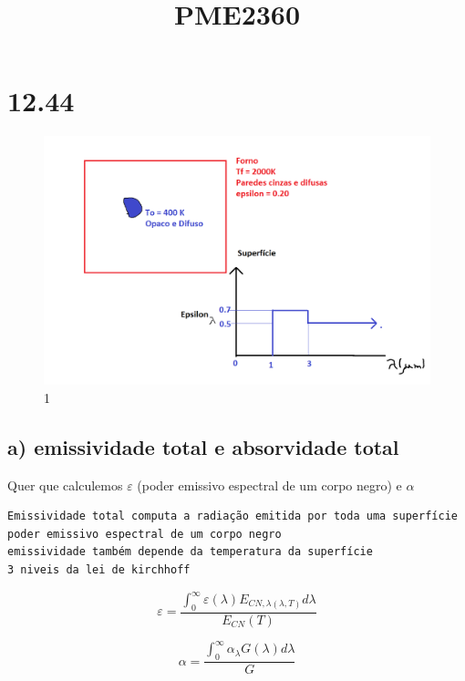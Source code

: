 \documentclass[a4paper, 12pt]{article}
\title{PME2360}
\begin{document}
\maketitle

\section{12.44}

\begin{figure}[h]
\begin{center}
\includegraphics[scale=0.28]{./fig/1.png}
\caption{\label{fig:1}1} 
\end{center}
\end{figure}

\subsection{a) emissividade total e absorvidade total}

Quer que calculemos $\varepsilon$ (poder emissivo espectral de um corpo negro) e $\alpha$


\begin{verbatim}
Emissividade total computa a radiação emitida por toda uma superfície
poder emissivo espectral de um corpo negro
emissividade também depende da temperatura da superfície
3 niveis da lei de kirchhoff
\end{verbatim}

\[\varepsilon = \frac{\int _{0} ^{\infty} {\varepsilon(\lambda)E_{CN,\lambda(\lambda ,T)}}d\lambda}{E_{CN}(T)}\]

\[\alpha = \frac{\int _{0}^{\infty}\alpha _{\lambda}G(\lambda)d\lambda }{G}\]
\end{document}
